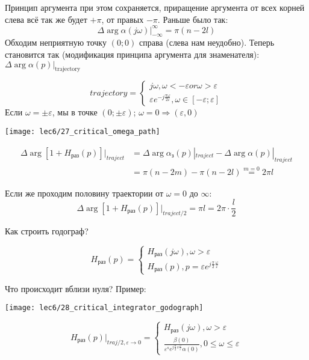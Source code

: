 \documentclass[main.tex]{subfiles}
\begin{document}
Принцип аргумента при этом сохраняется, приращение аргумента от всех корней слева всё так же будет $ + \pi $, от правых $ - \pi $.
Раньше было так:
 $$ \Delta \arg \alpha(j \omega) |_{- \infty}^\infty = \pi (n - 2 l) $$
Обходим неприятную точку $ (0;0) $ справа (слева нам неудобно).
Теперь становится так (модификация принципа аргумента для знаменателя): $\Delta \arg \alpha(p) |_{\text{trajectory}}$

$$ trajectory = \begin{cases}
    j \omega, \omega < - \varepsilon or \omega > \varepsilon \\
    \varepsilon e^{- j \frac{\pi \omega}{ 2 \varepsilon}}, \omega \in [- \varepsilon; \varepsilon]
\end{cases} $$
Если $ \omega = \pm \varepsilon $, мы в точке $ (0; \pm \varepsilon) $; $ \omega = 0 \Rightarrow (\varepsilon, 0) $

\texttt{[image: lec6/27\_critical\_omega\_path]}

\begin{align*}
    \Delta \arg [1 + H_{\text{раз}}(p)] |_{traject} & = \Delta \arg \alpha_{\text{з}}(p)|_{traject} - \Delta \arg \alpha (p) |_{traject} \\
    & = \pi(n-2m) - \pi(n-2l) \overset{m=0}= 2 \pi l
\end{align*}

Если же проходим половину траектории от $ \omega = 0 $ до $ \infty $:
$$ \Delta \arg [1 + H_{\text{раз}}(p)] |_{traject / 2} = \pi l = 2 \pi \cdot \frac{l}{2} $$

Как строить годограф?

$$ H_{\text{раз}}(p) = \begin{cases}
    H_{\text{раз}}(j \omega), \omega > \varepsilon \\
    H_{\text{раз}}(p), p = \varepsilon e^{j \frac{\pi}{2} \frac{\omega}{\varepsilon}}
\end{cases} $$

Что происходит вблизи нуля?
Пример:

\texttt{[image: lec6/28\_critical\_integrator\_godograph]}

$$ H_{\text{раз}}(p) |_{traj / 2, \varepsilon \to 0} = \begin{cases}
    H_{\text{раз}}(j \omega), \omega > \varepsilon \\
    \frac{\beta(0)}{\varepsilon^s e^{j \frac{\pi}{2} s \frac{\omega}{\varepsilon}} \alpha(0)}, 0 \le \omega \le \varepsilon
\end{cases} $$
\end{document}
